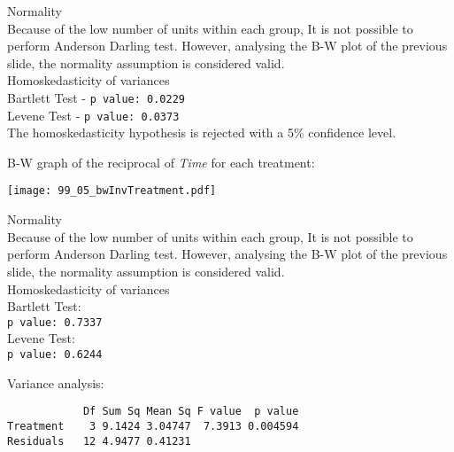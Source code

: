 \begin{frame}
  Normality\\
  \vspace*{0.25cm}
  Because of the low number of units within each group, It is not possible to perform Anderson Darling test. However, analysing the B-W plot of the previous slide, the normality assumption is considered valid. \\ 
  \vspace{1cm}
  Homoskedasticity of variances\\
  \vspace*{0.25cm}
  Bartlett Test - \texttt{p value: 0.0229}\\
  Levene Test - \texttt{p value: 0.0373}\\
  \vspace*{0.75cm}
  The homoskedasticity hypothesis is rejected with a 5\% confidence level.
\end{frame}

\begin{frame}
  B-W graph of the reciprocal of \textit{Time} for each treatment:\\
  \vspace{-0.5cm}
  \begin{center}
    \texttt{[image: 99\_05\_bwInvTreatment.pdf]}
  \end{center}
\end{frame}

\begin{frame}
  Normality\\
  \vspace*{0.25cm}
  Because of the low number of units within each group, It is not possible to perform Anderson Darling test. However, analysing the B-W plot of the previous slide, the normality assumption is considered valid. \\ 
  \vspace{1cm}
  Homoskedasticity of variances\\
  \vspace*{0.25cm}
  Bartlett Test:\\
  \texttt{p value: 0.7337}\\
  \vspace*{0.75cm}
  Levene Test:\\
  \texttt{p value: 0.6244}\\
\end{frame}

\begin{frame}[fragile]
  \vspace{0.25cm}
  Variance analysis:
  \begin{verbatim}  
            Df Sum Sq Mean Sq F value  p value  
Treatment    3 9.1424 3.04747  7.3913 0.004594
Residuals   12 4.9477 0.41231       
  \end{verbatim}
\end{frame}

